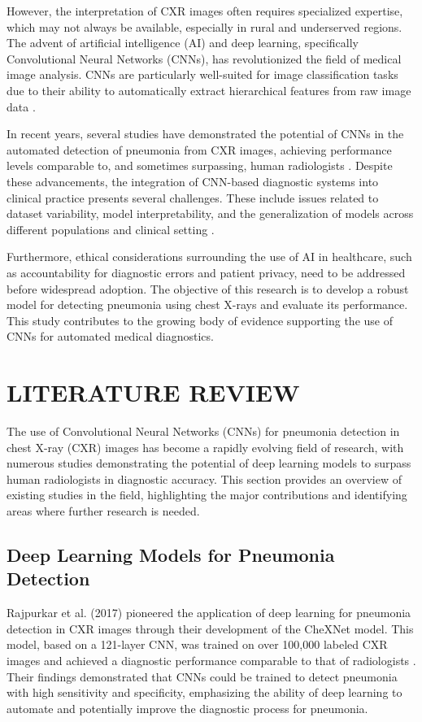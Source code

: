 \documentclass[
  twocolumn,
  10pt,
  a4paper,
  journal
]{IEEEtran}
\begin{document}
However, the interpretation of CXR images often requires specialized expertise, which may not always be available, especially in rural and underserved regions. The advent of artificial intelligence (AI) and deep learning, specifically Convolutional Neural Networks (CNNs), has revolutionized the field of medical image analysis. CNNs are particularly well-suited for image classification tasks due to their ability to automatically extract hierarchical features from raw image data \cite{lecun2015}.

In recent years, several studies have demonstrated the potential of CNNs in the automated detection of pneumonia from CXR images, achieving performance levels comparable to, and sometimes surpassing, human radiologists \cite{xie2018}. Despite these advancements, the integration of CNN-based diagnostic systems into clinical practice presents several challenges. These include issues related to dataset variability, model interpretability, and the generalization of models across different populations and clinical setting \cite{liu2020}. 

Furthermore, ethical considerations surrounding the use of AI in healthcare, such as accountability for diagnostic errors and patient privacy, need to be addressed before widespread adoption. The objective of this research is to develop a robust model for detecting pneumonia using chest X-rays and evaluate its performance. This study contributes to the growing body of evidence supporting the use of CNNs for automated medical diagnostics.

\section{LITERATURE REVIEW}

The use of Convolutional Neural Networks (CNNs) for pneumonia detection in chest X-ray (CXR) images has become a rapidly evolving field of research, with numerous studies demonstrating the potential of deep learning models to surpass human radiologists in diagnostic accuracy. This section provides an overview of existing studies in the field, highlighting the major contributions and identifying areas where further research is needed.

\subsection{Deep Learning Models for Pneumonia Detection}

Rajpurkar et al. (2017) pioneered the application of deep learning for pneumonia detection in CXR images through their development of the CheXNet model. This model, based on a 121-layer CNN, was trained on over 100,000 labeled CXR images and achieved a diagnostic performance comparable to that of radiologists \cite{rajpurkar2017a}. Their findings demonstrated that CNNs could be trained to detect pneumonia with high sensitivity and specificity, emphasizing the ability of deep learning to automate and potentially improve the diagnostic process for pneumonia.
\end{document}
